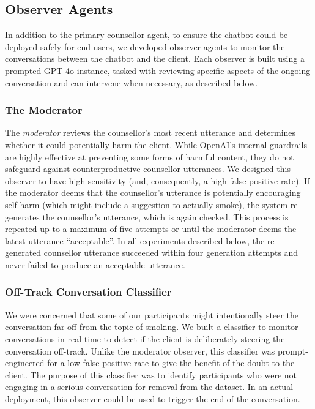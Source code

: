 \subsection{Observer Agents}
In addition to the primary counsellor agent, to ensure the chatbot could be deployed safely for end users, we developed observer agents to monitor the conversations between the chatbot and the client. Each observer is built using a prompted GPT-4o instance,
tasked with reviewing specific aspects of the ongoing conversation and can intervene when necessary, as described below.

\subsubsection{The Moderator}
The \textit{moderator} reviews the counsellor's most recent utterance and determines whether it could potentially harm the client. While OpenAI's internal guardrails \citep{openai_safety_update_2024} are highly effective at preventing some forms of harmful content, they do not safeguard against counterproductive counsellor utterances. We designed this observer to have high sensitivity (and, consequently, a high false positive rate). If the moderator deems that the counsellor's utterance is potentially encouraging self-harm (which might include a suggestion to actually smoke), the system re-generates the counsellor's utterance, which is again checked. This process is repeated up to a maximum of five attempts or until the moderator deems the latest utterance ``acceptable''. In all experiments described below, the re-generated counsellor utterance succeeded within four generation attempts and never failed to produce an acceptable utterance.

\subsubsection{Off-Track Conversation Classifier}
We were concerned that some of our participants might intentionally steer the conversation far off from the topic of smoking.
We built a classifier to monitor conversations in real-time to detect if the client is deliberately steering the conversation off-track. Unlike the moderator observer, this classifier was prompt-engineered for a low false positive rate to give the benefit of the doubt to the client. The purpose of this classifier was to identify participants who were not engaging in a serious conversation for removal from the dataset. In an actual deployment, this observer could be used to trigger the end of the conversation.

